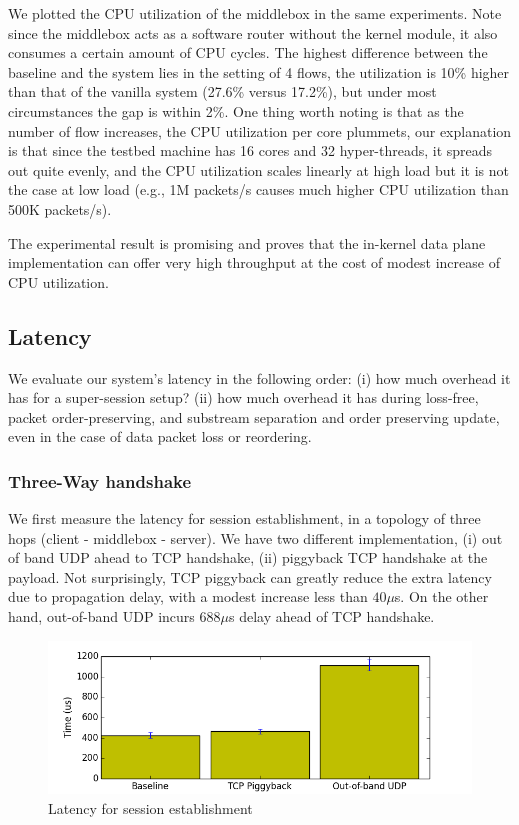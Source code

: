 We plotted the CPU utilization of the middlebox in the same experiments. Note since the middlebox acts as a software router without the kernel module, it also consumes a certain amount of CPU cycles. The highest difference between the baseline and the system lies in the setting of 4 flows, the utilization is 10\% higher than that of the vanilla system (27.6\% versus 17.2\%), but under most circumstances the gap is within 2\%. One thing worth noting is that as the number of flow increases, the CPU utilization per core plummets, our explanation is that since the testbed machine has 16 cores and 32 hyper-threads, it spreads out quite evenly, and the CPU utilization scales linearly at high load but it is not the case at low load (e.g., 1M packets/s causes much higher CPU utilization than 500K packets/s). 


The experimental result is promising and proves that the in-kernel data plane implementation can offer very high throughput at the cost of modest increase of CPU utilization. 



\subsection{Latency}
We evaluate our system's latency in the following order: (i) how much overhead it has for a super-session setup? (ii) how much overhead it has during loss-free, packet order-preserving, and substream separation and order preserving update, even in the case of data packet loss or reordering. 


\subsubsection{Three-Way handshake}
We first measure the latency for session establishment, in a topology of three hops (client - middlebox - server). We have two different implementation, (i) out of band UDP ahead to TCP handshake, (ii) piggyback TCP handshake at the payload. Not surprisingly, TCP piggyback can greatly reduce the extra latency due to propagation delay, with a modest increase less than $40 \mu $s. On the other hand, out-of-band UDP incurs $688\mu$s delay ahead of TCP handshake. 

\begin{figure}[ht]
\centering
\includegraphics[width=\linewidth]{figures/threeway.png} 
\caption{\small Latency for session establishment}\label{threeway}
\end{figure}
